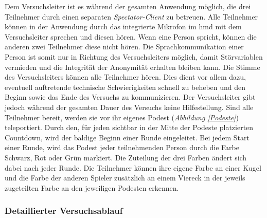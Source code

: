 \documentclass[a4paper,11pt]{article}%
\renewcommand{\\}{\vspace*{0.5\baselineskip} \newline}
\begin{document}
{Dem Versuchsleiter ist es während der gesamten Anwendung möglich, die drei Teilnehmer durch einen separaten \textit{Spectator-Client} zu betreuen. Alle Teilnehmer können in der Anwendung durch das integrierte Mikrofon im \ac{hmd} mit dem Versuchsleiter sprechen und diesen hören. Wenn eine Person spricht, können die anderen zwei Teilnehmer diese nicht hören. Die Sprachkommunikation einer Person ist somit nur in Richtung des Versuchsleiters möglich, damit Störvariablen vermieden und die Integrität der Anonymität erhalten bleiben kann. Die Stimme des Versuchsleiters können alle Teilnehmer hören. Dies dient vor allem dazu, eventuell auftretende technische Schwierigkeiten schnell zu beheben und den Beginn sowie das Ende des Versuchs zu kommunizieren. Der Versuchsleiter gibt jedoch während der gesamten Dauer des Versuchs keine Hilfestellung.
Sind alle Teilnehmer bereit, werden sie vor ihr eigenes Podest (\textit{Abbildung \ref{Podeste}}) teleportiert. Durch den, für jeden sichtbar in der Mitte der Podeste platzierten Countdown, wird der baldige Beginn einer Runde eingeleitet. Bei jedem Start einer Runde, wird das Podest jeder teilnehmenden Person durch die Farbe Schwarz, Rot oder Grün markiert. Die Zuteilung der drei Farben ändert sich dabei nach jeder Runde. Die Teilnehmer können ihre eigene Farbe an einer Kugel und die Farbe der anderen Spieler zusätzlich an einem Viereck in der jeweils zugeteilten Farbe an den jeweiligen Podesten erkennen.

	\subsubsection{Detaillierter Versuchsablauf}

}
\end{document}
